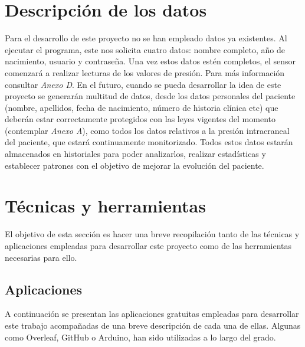 
\section{Descripción de los datos}
Para el desarrollo de este proyecto no se han empleado datos ya existentes. Al ejecutar el programa, este nos solicita cuatro datos: nombre completo, año de nacimiento, usuario y contraseña. Una vez estos datos estén completos, el sensor comenzará a realizar lecturas de los valores de presión. Para más información consultar \textit{Anexo D}. En el futuro, cuando se pueda desarrollar la idea de este proyecto se generarán multitud de datos, desde los datos personales del paciente (nombre, apellidos, fecha de nacimiento, número de historia clínica etc) que deberán estar correctamente protegidos con las leyes vigentes del momento (contemplar \textit{Anexo A}), como todos los datos relativos a la presión intracraneal del paciente, que estará continuamente monitorizado. Todos estos datos estarán almacenados en historiales para poder analizarlos, realizar estadísticas y establecer patrones con el objetivo de mejorar la evolución del paciente.
 
\section{Técnicas y herramientas}

El objetivo de esta sección es hacer una breve recopilación tanto de las técnicas y aplicaciones empleadas para desarrollar este proyecto como de las herramientas necesarias para ello.

\subsection{Aplicaciones}

A continuación se presentan las aplicaciones gratuitas empleadas para desarrollar este trabajo acompañadas de una breve descripción de cada una de ellas. Algunas como Overleaf, GitHub o Arduino, han sido utilizadas a lo largo del grado.

